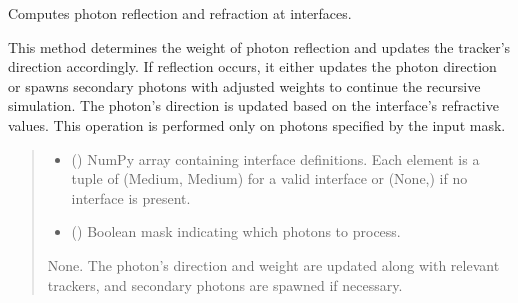 \documentclass[letterpaper,10pt,english]{sphinxmanual}
\begin{document}
\begin{fulllineitems}
\begin{fulllineitems}
\end{fulllineitems}


\begin{fulllineitems}
\label{\detokenize{generated/photon_canon.optics:photon_canon.optics.Photon.reflect_refract}}
\pysigstartsignatures
\pysiglinewithargsret
{}
{\sphinxparamcomma {}}
{}
\pysigstopsignatures
\sphinxAtStartPar
Computes photon reflection and refraction at interfaces.

\sphinxAtStartPar
This method determines the weight of photon reflection and updates the tracker’s direction accordingly.
If reflection occurs, it either updates the photon direction or spawns secondary photons with adjusted weights
to continue the recursive simulation. The photon’s direction is updated based on the interface’s refractive
values. This operation is performed only on photons specified by the input mask.
\begin{quote}\begin{description}
\begin{itemize}
\item {} 
\sphinxAtStartPar
{} (\sphinxstyleliteralemphasis{\sphinxupquote{{[}}}\sphinxstyleliteralemphasis{\sphinxupquote{{]}}}) \textendash{} NumPy array containing interface definitions.
Each element is a tuple of (Medium, Medium) for a valid interface or (None,) if no interface
is present.

\item {} 
\sphinxAtStartPar
{} (\sphinxstyleliteralemphasis{\sphinxupquote{{[}}}\sphinxstyleliteralemphasis{\sphinxupquote{{]}}}) \textendash{} Boolean mask indicating which photons to process.

\end{itemize}

\sphinxAtStartPar
None. The photon’s direction and weight are updated along with relevant trackers,
and secondary photons are spawned if necessary.


\end{description}
\end{quote}
\end{fulllineitems}
\end{fulllineitems}
\end{document}
